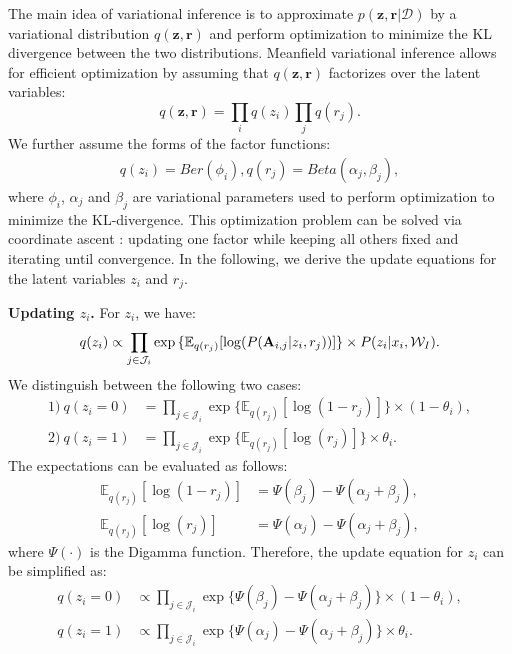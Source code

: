 The main idea of variational inference \cite{tzikas2008variational} is to approximate $p(\mathbf{z},\mathbf{r} | \mathcal{D})$ by a variational distribution $q(\mathbf{z},\mathbf{r})$ and perform optimization to minimize the KL divergence between the two distributions. Meanfield variational inference allows for efficient optimization by assuming that $q(\mathbf{z},\mathbf{r})$ factorizes over the latent variables:
\begin{equation}
    q(\mathbf{z},\mathbf{r})=\prod_{i} q(z_i) \prod_j q(r_j).
    \label{eq:dist_fact}
\end{equation}
%
We further assume the forms of the factor functions:
\begin{align}
    q(z_i)=Ber(\phi_i), q(r_j)=Beta(\alpha_j,\beta_j),
\end{align}
%
where $\phi_i$, $\alpha_j$ and $\beta_j$ are variational parameters used to perform optimization to minimize the KL-divergence. This optimization problem can be solved via coordinate ascent \cite{blei2017variational}: updating one factor while keeping all others fixed and iterating until convergence. In the following, we derive the update equations for the latent variables $z_i$ and $r_j$.

\smallskip
\noindent\textbf{Updating $z_i$.} For $z_i$, we have:
%
\begin{equation}
q(z_i)    \propto \prod_{j \in \mathcal{J}_{i}} \exp{\{\mathbb{E}_{q(r_j)}[\log (P(\mathbf{A}_{i,j}|z_i,r_j))]\}}   \times P(z_i|x_i, \mathcal{W}_I). \\
\end{equation}
%
We distinguish between the following two cases:
%
\begin{align}
  1)~ q(z_i=0)   &= \prod_{j \in \mathcal{J}_{i}} \exp{\{\mathbb{E}_{q(r_j)}[\log (1-r_j)]\}}\times (1-\theta_i) \nonumber, \\
  2)~ q(z_i=1)   &= \prod_{j \in \mathcal{J}_{i}} \exp{\{\mathbb{E}_{q(r_j)}[\log (r_j)]\}}\times \theta_i .
\label{eq:q_two_poss}                
\end{align}
%
The expectations can be evaluated as follows:
\begin{align}
    \mathbb{E}_{q(r_j)}[\log (1-r_j)]&= \Psi(\beta_j)-\Psi(\alpha_j+\beta_j), \nonumber \\
    \mathbb{E}_{q(r_j)}[\log (r_j)]&= \Psi(\alpha_j)-\Psi(\alpha_j+\beta_j),
    \label{eq:expect}
\end{align}
where $\Psi(\cdot)$ is the Digamma function. Therefore, the update equation for $z_i$ can be simplified as:
\begin{align}
    q(z_i=0)   &\propto \prod_{j \in \mathcal{J}_{i}} \exp{\{\Psi(\beta_j)-\Psi(\alpha_j+\beta_j)\}}\times (1-\theta_i), \nonumber \\  
     q(z_i=1)    &\propto \prod_{j \in \mathcal{J}_{i}} \exp{\{ \Psi(\alpha_j)-\Psi(\alpha_j+\beta_j)\}}\times \theta_i  .
     \label{eq:qzi}
\end{align}

